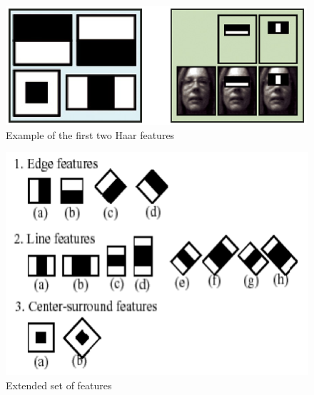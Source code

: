 \begin{figure}[!h]
\begin{center}
\noindent \includegraphics[scale=0.9]{figures/haar_features_first_2_stage} 
\newline
\caption{Example of the first two Haar features}
\label{haar_features_first_2_stage}
\end{center} 
\end{figure}

\begin{figure}[!h]
\begin{center}
\noindent \includegraphics[scale=0.6]{figures/haar_features_extended} 
\newline
\caption{Extended set of features}
\label{haar_features_extended}
\end{center} 
\end{figure}

